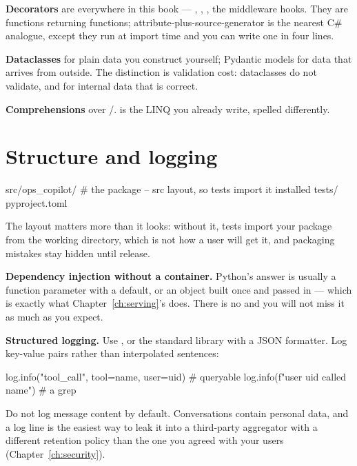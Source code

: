 \textbf{Decorators} are everywhere in this book --- ,
, , the middleware hooks. They are functions
returning functions; attribute-plus-source-generator is the nearest C\# analogue,
except they run at import time and you can write one in four lines.

\textbf{Dataclasses} for plain data you construct yourself; Pydantic models for
data that arrives from outside. The distinction is validation cost: dataclasses
do not validate, and for internal data that is correct.

\textbf{Comprehensions} over /. \code{[f(x) for x in xs if
p(x)]} is the LINQ you already write, spelled differently.

\section{Structure and logging}
\label{sec:project-structure}

\begin{python}[caption={The layout this book assumes}, label={lst:layout}]
src/ops_copilot/       # the package -- src layout, so tests import it installed
tests/
pyproject.toml
\end{python}

The  layout matters more than it looks: without it, tests import your
package from the working directory, which is not how a user will get it, and
packaging mistakes stay hidden until release.

\textbf{Dependency injection without a container.} Python's answer is usually a
function parameter with a default, or an object built once and passed in ---
which is exactly what Chapter~\ref{ch:serving}'s  does. There is
no  and you will not miss it as much as you expect.

\textbf{Structured logging.} Use , or the standard library with
a JSON formatter. Log key-value pairs rather than interpolated sentences:

\begin{python}[caption={Queryable, versus greppable}, label={lst:logging}]
log.info("tool_call", tool=name, user=uid)     # queryable
log.info(f"user {uid} called {name}")          # a grep
\end{python}

\begin{warning}
Do not log message content by default. Conversations contain personal data, and
a log line is the easiest way to leak it into a third-party aggregator with a
different retention policy than the one you agreed with your users
(Chapter~\ref{ch:security}).
\end{warning}

